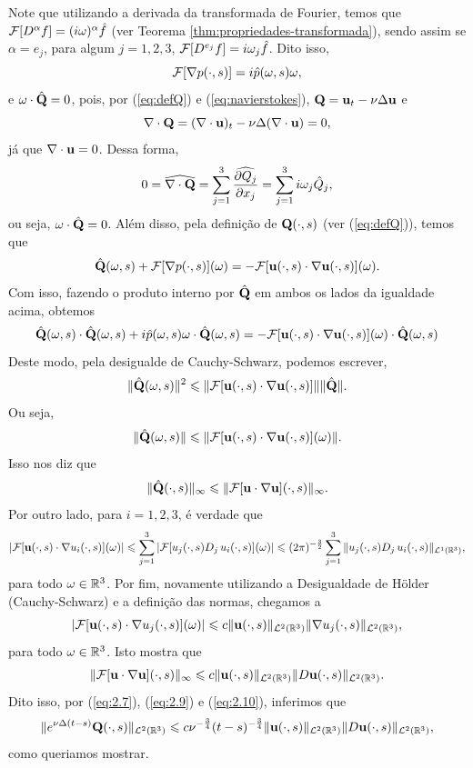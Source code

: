 \begin{prf}
    Note que utilizando a derivada da transformada de Fourier, temos que $\mathcal{F}[D^\alpha f] = (i\omega)^\alpha \hat f$ (ver Teorema \ref{thm:propriedades-transformada}), sendo assim se $\alpha = e_j$, para algum $j = 1,2,3$, $\mathcal{F} [D^{e_j} f] = i\omega_j \hat f$. Dito isso,
    \[
        \mathcal{F}[\nabla p(\cdot,s)] = i \hat p(\omega,s) \omega,
    \] 
    e $\omega \cdot \hat{\mathbf{Q}} = 0$, pois, por (\ref{eq:defQ}) e (\ref{eq:navierstokes}), $\mathbf{Q} = \mathbf{u}_t - \nu \Delta \mathbf{u}$ e 
    \[
        \nabla \cdot \mathbf{Q} = (\nabla \cdot \mathbf{u})_t - \nu \Delta (\nabla \cdot \mathbf{u}) = 0,
    \]
    já que $\nabla \cdot \mathbf{u} = 0$. Dessa forma,
    \[
        0 = \widehat{\nabla \cdot \mathbf{Q}} = \sum_{j=1}^3 \widehat{\frac{\partial Q_j}{\partial x_j}} = \sum_{j=1}^3 i \omega_j \hat Q_j,
    \] 
    ou seja, $\omega \cdot \hat{\mathbf{Q}} = 0$. Além disso, pela definição de $\mathbf{Q}(\cdot,s)$ (ver (\ref{eq:defQ})), temos que
    \[
        \hat{\mathbf{Q}}(\omega,s) + \mathcal{F}[\nabla p(\cdot,s)](\omega) = -\mathcal{F}[\mathbf{u}(\cdot,s) \cdot \nabla\mathbf{u}(\cdot,s)](\omega).
    \]
    Com isso, fazendo o produto interno por $\hat{\mathbf{Q}}$ em ambos os lados da igualdade acima, obtemos
    \[
        \hat{\mathbf{Q}}(\omega,s) \cdot \hat{\mathbf{Q}}(\omega,s) + i \hat p (\omega,s) \omega \cdot \hat{\mathbf{Q}}(\omega,s) =  -\mathcal{F}[\mathbf{u}(\cdot,s) \cdot \nabla\mathbf{u}(\cdot,s)](\omega) \cdot \hat{\mathbf{Q}}(\omega,s)
    \]
    Deste modo, pela desigualde de Cauchy-Schwarz, podemos escrever,
    \[
        \Vert \hat{\mathbf{Q}}(\omega,s) \Vert^2 \leqslant \Vert \mathcal{F} [\mathbf{u}(\cdot,s) \cdot \nabla \mathbf{u}(\cdot,s)] \Vert \Vert \hat{\mathbf{Q}} \Vert.
    \]
    Ou seja,
    \[
        \Vert \hat{\mathbf{Q}}(\omega,s) \Vert \leqslant \Vert \mathcal{F}[\mathbf{u}(\cdot,s) \cdot \nabla\mathbf{u}(\cdot,s)](\omega) \Vert.
    \]
    Isso nos diz que
    \begin{equation} \label{eq:2.9}
        \Vert \hat{\mathbf{Q}} (\cdot,s) \Vert_\infty \leqslant \Vert \mathcal{F} [\mathbf{u} \cdot \nabla \mathbf{u}](\cdot,s) \Vert_\infty.
    \end{equation}
    Por outro lado, para $i = 1,2,3$, é verdade que
    \[
        | \mathcal{F}[\mathbf{u} (\cdot,s) \cdot \nabla u_i(\cdot,s)](\omega)| \leqslant \sum_{j=1}^{3} | \mathcal{F}[u_j (\cdot,s) D_j\, u_i(\cdot,s)](\omega)| \leqslant (2\pi)^{-\frac{3}{2}} \sum_{j=1}^3 \Vert u_j(\cdot,s) D_j\,u_i(\cdot,s) \Vert_{\mathcal{L}^1(\mathbb{R}^3)},
    \]
    para todo $\omega \in \mathbb{R}^3$.
    Por fim, novamente utilizando a Desigualdade de Hölder (Cauchy-Schwarz) e a definição das normas, chegamos a
    \[
        | \mathcal{F}[\mathbf{u} (\cdot,s) \cdot \nabla u_j(\cdot,s)](\omega)| \leqslant c \Vert \mathbf{u}(\cdot,s) \Vert_{\mathcal{L}^2(\mathbb{R}^3)} \Vert \nabla u_j(\cdot,s) \Vert_{\mathcal{L}^2(\mathbb{R}^3)},
    \]
    para todo $\omega \in \mathbb{R}^3$.
    Isto mostra que
    \begin{equation} \label{eq:2.10}
        \Vert \mathcal{F}[\mathbf{u}\cdot \nabla \mathbf{u}] (\cdot,s) \Vert_\infty \leqslant c\Vert \mathbf{u}(\cdot,s) \Vert_{\mathcal{L}^2(\mathbb{R}^3)} \Vert D \mathbf{u}(\cdot,s) \Vert_{\mathcal{L}^2(\mathbb{R}^3)}.
    \end{equation}
    Dito isso, por (\ref{eq:2.7}), (\ref{eq:2.9}) e (\ref{eq:2.10}), inferimos que
    \[
        \Vert e^{\nu\Delta(t-s)}\mathbf{Q}(\cdot,s) \Vert_{\mathcal{L}^2(\mathbb{R}^3)} \leqslant c \nu^{-\frac{3}{4}} (t-s)^{-\frac{3}{4}} \Vert \mathbf{u}(\cdot,s) \Vert_{\mathcal{L}^2(\mathbb{R}^3)} \Vert D\mathbf{u}(\cdot,s) \Vert_{\mathcal{L}^2(\mathbb{R}^3)},
    \]
    como queriamos mostrar.
\end{prf}

